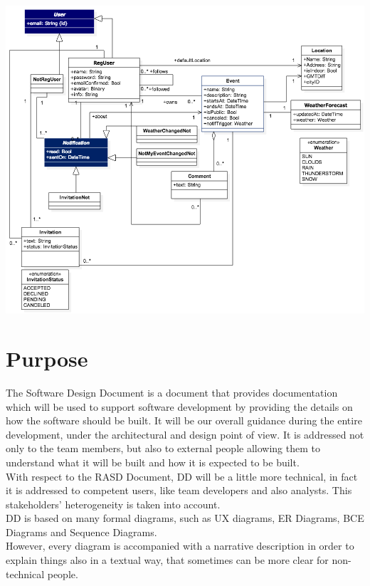 \documentclass[12pt]{book}
\begin{document}
\newpage
\begin{landscape}
\begin{center}
\includegraphics[scale=0.57]{class_diagram}
\end{center}
\end{landscape}

\section{Purpose}
The Software Design Document is a document that provides documentation which will be used to support software development by providing the details on how the software should be built. It will be our overall guidance during the entire development, under the architectural and design point of view. It is addressed not only to the team members, but also to external people allowing them to understand what it will be built and how it is expected to be built. \\
With respect to the RASD Document, DD will be a little more technical, in fact it is addressed to competent users, like team developers and also analysts. This stakeholders' heterogeneity is taken into account. \\
DD is based on many formal diagrams, such as UX diagrams, ER Diagrams, BCE Diagrams and Sequence Diagrams. \\
However, every diagram is accompanied with a narrative description in order to explain things also in a textual way, that sometimes can be more clear for non-technical people. \\
\end{document}
